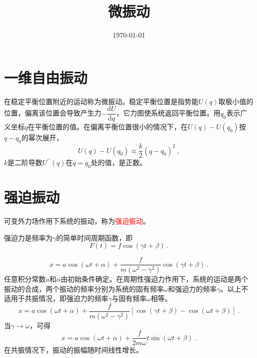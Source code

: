 \documentclass[11pt,a4paper]{article}
\title{微振动}
\author{}
\date{\today}
\newcommand{\dif}{\mathrm{d}}
\begin{document}
\maketitle

\section{一维自由振动}
\cite{2007理论物理学教程} 在稳定平衡位置附近的运动称为微振动。稳定平衡位置是指势能$U(q)$取极小值的位置，偏离该位置会导致产生力$-\dfrac{\dif U}{\dif q}$，它力图使系统返回平衡位置。用$q_0$表示广义坐标$q$在平衡位置的值。在偏离平衡位置很小的情况下，在$U(q)-U(q_0)$按$q-q_0$的幂次展开，
\begin{equation*}
U(q) - U(q_0) \approx \dfrac{k}{2} (q-q_0)^2 ~,
\end{equation*}
$k$是二阶导数$U^{\prime \prime}(q)$在$q =q_0$处的值，是正数。





\section{强迫振动}
\cite{2007理论物理学教程} 可变外力场作用下系统的振动，称为\textcolor{red}{强迫振动}。


强迫力是频率为$\gamma$的简单时间周期函数，即
\begin{equation}
F(t) = f \cos(\gamma t +\beta) ~.
\end{equation}

\begin{equation}
x = a\cos (\omega t +\alpha) +\dfrac{f}{m(\omega^2 -\gamma^2)} \cos(\gamma t +\beta) ~.
\end{equation}
任意积分常数$a$和$\alpha$由初始条件确定。在周期性强迫力作用下，系统的运动是两个振动的合成，两个振动的频率分别为系统的固有频率$\omega$和强迫力的频率$\gamma$。以上不适用于共振情况，即强迫力的频率$\gamma$与固有频率$\omega$相等。
\begin{equation}
x = a\cos (\omega t +\alpha) +\dfrac{f}{m(\omega^2 -\gamma^2)} [ \cos(\gamma t +\beta) -\cos(\omega t +\beta)] ~.
\end{equation}
当$\gamma \rightarrow \omega$，可得
\begin{equation}
x = a\cos (\omega t +\alpha) +\dfrac{f}{2m \omega} t \sin(\omega t +\beta) ~.
\end{equation}
在共振情况下，振动的振幅随时间线性增长。
\end{document}
